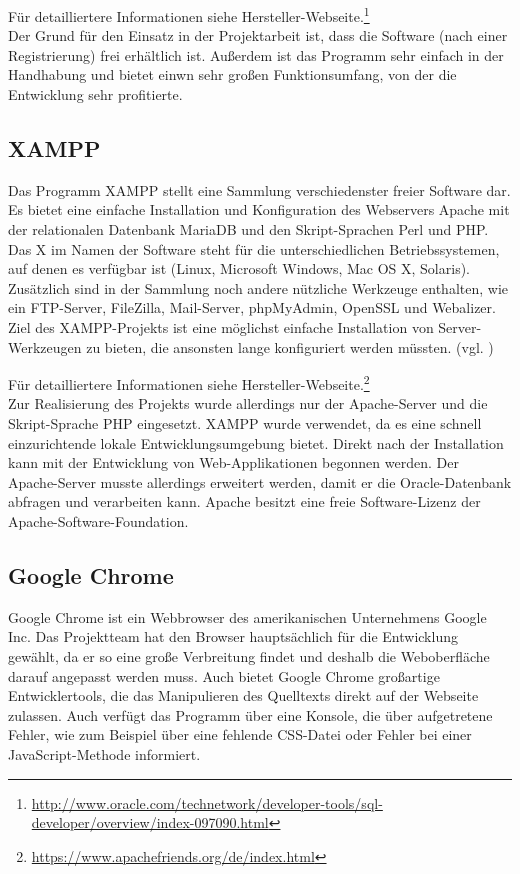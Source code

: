 Für detailliertere Informationen siehe Hersteller-Webseite.\footnote{\url{http://www.oracle.com/technetwork/developer-tools/sql-developer/overview/index-097090.html}} \\ 

Der Grund für den Einsatz in der Projektarbeit ist, dass die Software (nach einer Registrierung) frei erhältlich ist. Außerdem ist das Programm sehr einfach in der Handhabung und bietet einwn sehr großen Funktionsumfang, von der die Entwicklung sehr profitierte.



\subsection{XAMPP} 
Das Programm XAMPP stellt eine Sammlung verschiedenster freier Software dar. Es bietet eine einfache Installation und Konfiguration des Webservers Apache mit der relationalen Datenbank MariaDB und den Skript-Sprachen Perl und PHP. Das X im Namen der Software steht für die unterschiedlichen Betriebssystemen, auf denen es verfügbar ist (Linux, Microsoft Windows, Mac OS X, Solaris). Zusätzlich sind in der Sammlung noch andere nützliche Werkzeuge enthalten, wie ein FTP-Server, FileZilla, Mail-Server, phpMyAdmin, OpenSSL und Webalizer. Ziel des XAMPP-Projekts ist eine möglichst einfache Installation von Server-Werkzeugen zu bieten, die ansonsten lange konfiguriert werden müssten. (vgl. \cite{xampp})

Für detailliertere Informationen siehe Hersteller-Webseite.\footnote{\url{https://www.apachefriends.org/de/index.html}} \\ 

Zur Realisierung des Projekts wurde allerdings nur der Apache-Server und die Skript-Sprache PHP eingesetzt. XAMPP wurde verwendet, da es eine schnell einzurichtende lokale Entwicklungsumgebung bietet. Direkt nach der Installation kann mit der Entwicklung von Web-Applikationen begonnen werden. Der Apache-Server musste allerdings erweitert werden, damit er die Oracle-Datenbank abfragen und verarbeiten kann. Apache besitzt eine freie Software-Lizenz der Apache-Software-Foundation.


\subsection{Google Chrome}
Google Chrome ist ein Webbrowser des amerikanischen Unternehmens Google Inc. 
Das Projektteam hat den Browser hauptsächlich für die Entwicklung gewählt, da er so eine große Verbreitung findet und deshalb die Weboberfläche darauf angepasst werden muss. Auch bietet Google Chrome großartige Entwicklertools, die das Manipulieren des Quelltexts direkt auf der Webseite zulassen. Auch verfügt das Programm über eine Konsole, die über aufgetretene Fehler, wie zum Beispiel über eine fehlende CSS-Datei oder Fehler bei einer JavaScript-Methode informiert.

